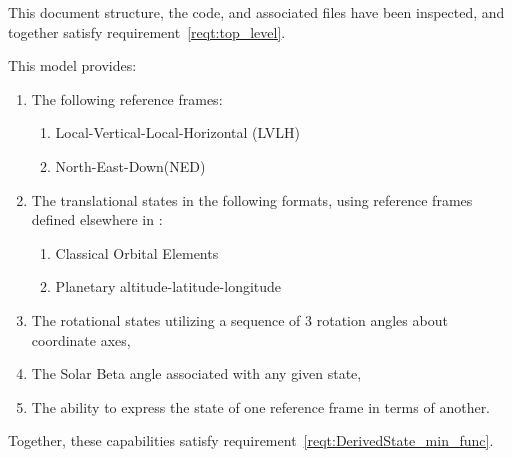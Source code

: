 %
%
% 
%


\label{inspect:top_level}
 This document structure, the code, and associated files have been inspected, and together satisfy requirement~\ref{reqt:top_level}.

\label{inspect:DerivedState_min_func}
 This model provides:
\begin{enumerate}

 \item The following reference frames:
\begin{enumerate}
 \item Local-Vertical-Local-Horizontal (LVLH)
\item North-East-Down(NED)
\end{enumerate}

\item The translational states in the following formats, using reference frames defined elsewhere in \JEODid:
\begin{enumerate}
 \item Classical Orbital Elements
 \item Planetary altitude-latitude-longitude
\end{enumerate}

\item The rotational states utilizing a sequence of 3 rotation angles about coordinate axes, 

\item The Solar Beta angle associated with any given state, 

\item The ability to express the state of one reference frame in terms of another.

\end{enumerate}  

Together, these capabilities satisfy requirement~\ref{reqt:DerivedState_min_func}.